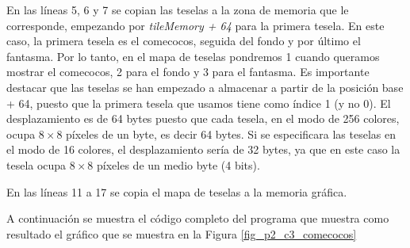 En las líneas 5, 6 y 7 se copian las teselas a la zona de memoria que le corresponde, empezando por \textit{tileMemory + 64} para la primera tesela. En este caso, la primera tesela es el comecocos, seguida del fondo y por último el fantasma. Por lo tanto, en el mapa de teselas pondremos 1 cuando queramos mostrar el comecocos, 2 para el fondo y 3 para el fantasma. Es importante destacar que las teselas se han empezado a almacenar a partir de la posición base + 64, puesto que la primera tesela que usamos tiene como índice 1 (y no 0). El desplazamiento es de 64 bytes puesto que cada tesela, en el modo de 256 colores, ocupa $8\times8$ píxeles de un byte, es decir 64 bytes. Si se especificara las teselas en el modo de 16 colores, el desplazamiento sería de 32 bytes, ya que en este caso la tesela ocupa $8\times8$ píxeles de un medio byte (4 bits).

En las líneas 11 a 17 se copia el mapa de teselas a la memoria gráfica.

A continuación se muestra el código completo del programa que muestra como resultado el gráfico que se muestra en la Figura \ref{fig_p2_c3_comecocos}

